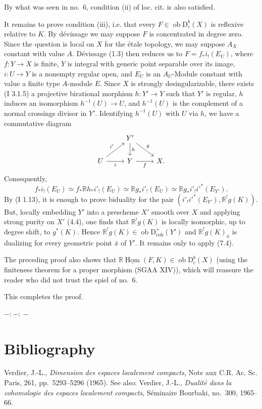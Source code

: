 \documentclass[11pt]{article}
\DeclareMathOperator{\Hom}{Hom}
\newcommand{\D}{\mathrm{D}}
\newcommand{\ob}{\operatorname{ob}}
\providecommand{\Hom}{\operatorname{Hom}}
\providecommand{\ob}{\operatorname{ob}}
\providecommand{\Hom}{\operatorname{Hom}}
\begin{document}
By what was seen in no.~6, condition (ii) of loc. cit. is also satisfied.

It remains to prove condition (iii), i.e. that every $F\in\ob\D_c^b(X)$ is reflexive relative to $K$. By dévissage we may suppose $F$ is concentrated in degree zero. Since the question is local on $X$ for the étale topology, we may suppose $A_X$ constant with value $A$. Dévissage (1.3) then reduces us to $F=f_*i_!(E_U)$, where $f:Y\to X$ is finite, $Y$ is integral with generic point separable over its image, $i:U\to Y$ is a nonempty regular open, and $E_U$ is an $A_U$-Module constant with value a finite type $A$-module $E$. Since $X$ is strongly desingularizable, there exists (I 3.1.5) a projective birational morphism $h:Y'\to Y$ such that $Y'$ is regular, $h$ induces an isomorphism $h^{-1}(U)\to U$, and $h^{-1}(U)$ is the complement of a normal crossings divisor in $Y'$. Identifying $h^{-1}(U)$ with $U$ via $h$, we have a commutative diagram
\[
\begin{tikzcd}
& Y' \arrow[d,"h"] \arrow[dr,"g"] & \\
U \arrow[ur,"i'"] \arrow[r,"i"'] & Y \arrow[r,"f"'] & X.
\end{tikzcd}
\]
Consequently,
\[
        f_*i_!(E_U)\simeq f_*\mathbb{R} h_* i'_!(E_U)\simeq \mathbb{R} g_* i'_!(E_U)\simeq \mathbb{R} g_* i'_! i'^*(E_{Y'}).
\]
By (I 1.13), it is enough to prove biduality for the pair $(i'_!i'^*(E_{Y'}),\mathbb{R}^!g(K))$. But, locally embedding $Y'$ into a prescheme $X'$ smooth over $X$ and applying strong purity on $X'$ (4.4), one finds that $\mathbb{R}^!g(K)$ is locally isomorphic, up to degree shift, to $g^*(K)$. Hence $\mathbb{R}^!g(K)\in\ob\D^{+}_{\mathrm{coh}}(Y')$ and $\mathbb{R}^!g(K)_{\bar{x}}$ is dualizing for every geometric point $\bar{x}$ of $Y'$. It remains only to apply (7.4).

The preceding proof also shows that $\mathbb{R}\underline{\Hom}(F,K)\in\ob\D_c^b(X)$ (using the finiteness theorem for a proper morphism (SGAA XIV)), which will reassure the reader who did not trust the spiel of no.~6.

This completes the proof.

\begin{center}
$-:\!-:\!-$
\end{center}

\section*{Bibliography}

\begin{enumerate}[label={[\arabic*]}]
\item Verdier, J.-L., \emph{Dimension des espaces localement compacts}, Note aux C.R. Ac. Sc. Paris, 261, pp.~5293--5296 (1965). See also: Verdier, J.-L., \emph{Dualité dans la cohomologie des espaces localement compacts}, Séminaire Bourbaki, no.~300, 1965--66.
\end{enumerate}
\end{document}
